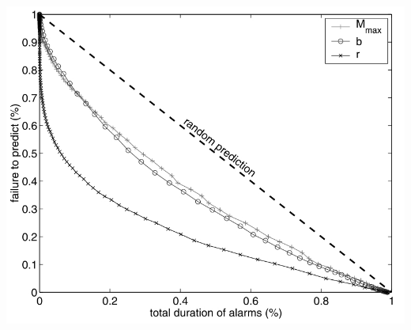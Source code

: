 \documentclass[aspectratio=43,9pt]{beamer}
\begin{document}
\begin{frame}
 {}
 
 \begin{minipage}{0.48\linewidth}
   \includegraphics[width=1\linewidth]{Figs/fig10}
 \end{minipage}
 \begin{minipage}{0.48\linewidth}

 \end{minipage}

 
\end{frame}
\end{document}
